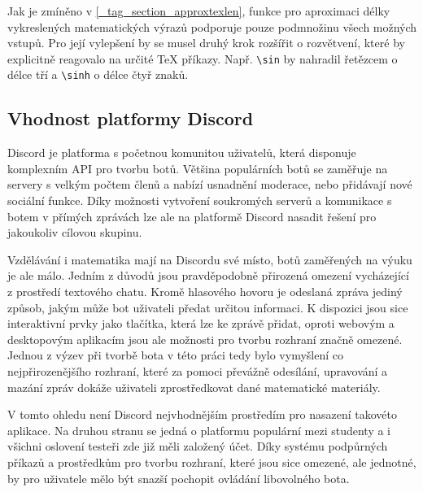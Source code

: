 \documentclass[FM]{tulthesis}
\begin{document}
	Jak je zmíněno v \ref{_tag_section_approxtexlen}, funkce pro aproximaci délky vykreslených matematických výrazů podporuje pouze podmnožinu všech možných vstupů. Pro její vylepšení by se musel druhý krok rozšířit o rozvětvení, které by explicitně reagovalo na určité TeX příkazy. Např. \verb|\sin| by nahradil řetězcem o délce tří a \verb|\sinh| o délce čtyř znaků. 
	
		
	\subsection{Vhodnost platformy Discord}
	
	Discord je platforma s početnou komunitou uživatelů, která disponuje komplexním API pro tvorbu botů. Většina populárních botů se zaměřuje na servery s velkým počtem členů a nabízí usnadnění moderace, nebo přidávají nové sociální funkce. Díky možnosti vytvoření soukromých serverů a komunikace s botem v přímých zprávách lze ale na platformě Discord nasadit řešení pro jakoukoliv cílovou skupinu.
	
	Vzdělávání i matematika mají na Discordu své místo, botů zaměřených na výuku je ale málo. Jedním z důvodů jsou pravděpodobně přirozená omezení vycházející z prostředí textového chatu. Kromě hlasového hovoru je odeslaná zpráva jediný způsob, jakým může bot uživateli předat určitou informaci. K dispozici jsou sice interaktivní prvky jako tlačítka, která lze ke zprávě přidat, oproti webovým a desktopovým aplikacím jsou ale možnosti pro tvorbu rozhraní značně omezené. Jednou z výzev při tvorbě bota v této práci tedy bylo vymyšlení co nejpřirozenějšího rozhraní, které za pomoci převážně odesílání, upravování a mazání zpráv dokáže uživateli zprostředkovat dané matematické materiály.
	
	V tomto ohledu není Discord nejvhodnějším prostředím pro nasazení takovéto aplikace. Na druhou stranu se jedná o platformu populární mezi studenty a i všichni oslovení testeři zde již měli založený účet. Díky systému podpůrných příkazů a prostředkům pro tvorbu rozhraní, které jsou sice omezené, ale jednotné, by pro uživatele mělo být snazší pochopit ovládání libovolného bota.
	
\end{document}
